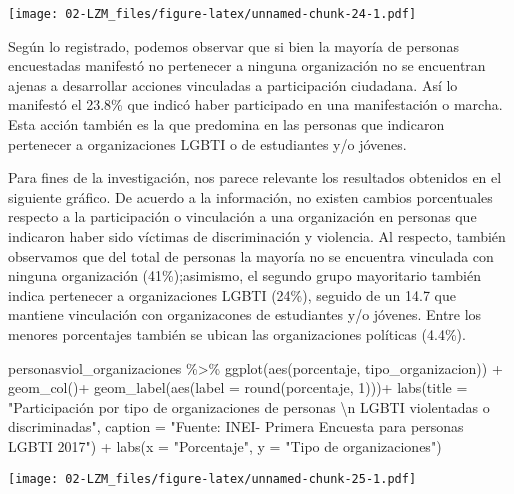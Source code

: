 \documentclass[
]{book}
\newenvironment{Shaded}{\begin{snugshade}}{\end{snugshade}}
\newcommand{\AttributeTok}[1]{\textcolor[rgb]{0.77,0.63,0.00}{#1}}
\newcommand{\DecValTok}[1]{\textcolor[rgb]{0.00,0.00,0.81}{#1}}
\newcommand{\FunctionTok}[1]{\textcolor[rgb]{0.00,0.00,0.00}{#1}}
\newcommand{\NormalTok}[1]{#1}
\newcommand{\SpecialCharTok}[1]{\textcolor[rgb]{0.00,0.00,0.00}{#1}}
\newcommand{\StringTok}[1]{\textcolor[rgb]{0.31,0.60,0.02}{#1}}
\theoremstyle{definition}
\theoremstyle{definition}
\theoremstyle{definition}
\theoremstyle{definition}
\theoremstyle{remark}
\begin{document}
\texttt{[image: 02-LZM\_files/figure-latex/unnamed-chunk-24-1.pdf]}

Según lo registrado, podemos observar que si bien la mayoría de personas encuestadas manifestó no pertenecer a ninguna organización no se encuentran ajenas a desarrollar acciones vinculadas a participación ciudadana. Así lo manifestó el 23.8\% que indicó haber participado en una manifestación o marcha. Esta acción también es la que predomina en las personas que indicaron pertenecer a organizaciones LGBTI o de estudiantes y/o jóvenes.

Para fines de la investigación, nos parece relevante los resultados obtenidos en el siguiente gráfico. De acuerdo a la información, no existen cambios porcentuales respecto a la participación o vinculación a una organización en personas que indicaron haber sido víctimas de discriminación y violencia. Al respecto, también observamos que del total de personas la mayoría no se encuentra vinculada con ninguna organización (41\%);asimismo, el segundo grupo mayoritario también indica pertenecer a organizaciones LGBTI (24\%), seguido de un 14.7 que mantiene vinculación con organizacones de estudiantes y/o jóvenes. Entre los menores porcentajes también se ubican las organizaciones políticas (4.4\%).

\begin{Shaded}
\begin{Highlighting}[]
\NormalTok{personasviol\_organizaciones }\SpecialCharTok{\%\textgreater{}\%} 
  \FunctionTok{ggplot}\NormalTok{(}\FunctionTok{aes}\NormalTok{(porcentaje, tipo\_organizacion)) }\SpecialCharTok{+}
  \FunctionTok{geom\_col}\NormalTok{()}\SpecialCharTok{+}
  \FunctionTok{geom\_label}\NormalTok{(}\FunctionTok{aes}\NormalTok{(}\AttributeTok{label =} \FunctionTok{round}\NormalTok{(porcentaje, }\DecValTok{1}\NormalTok{)))}\SpecialCharTok{+}
    \FunctionTok{labs}\NormalTok{(}\AttributeTok{title =} \StringTok{"Participación por tipo de organizaciones de personas }\SpecialCharTok{\textbackslash{}n}\StringTok{ LGBTI violentadas o discriminadas"}\NormalTok{, }
       \AttributeTok{caption =} \StringTok{"Fuente: INEI{-} Primera Encuesta para personas LGBTI 2017"}\NormalTok{) }\SpecialCharTok{+}
  \FunctionTok{labs}\NormalTok{(}\AttributeTok{x =} \StringTok{"Porcentaje"}\NormalTok{,}
       \AttributeTok{y =} \StringTok{"Tipo de organizaciones"}\NormalTok{)}
\end{Highlighting}
\end{Shaded}

\texttt{[image: 02-LZM\_files/figure-latex/unnamed-chunk-25-1.pdf]}
\end{document}
